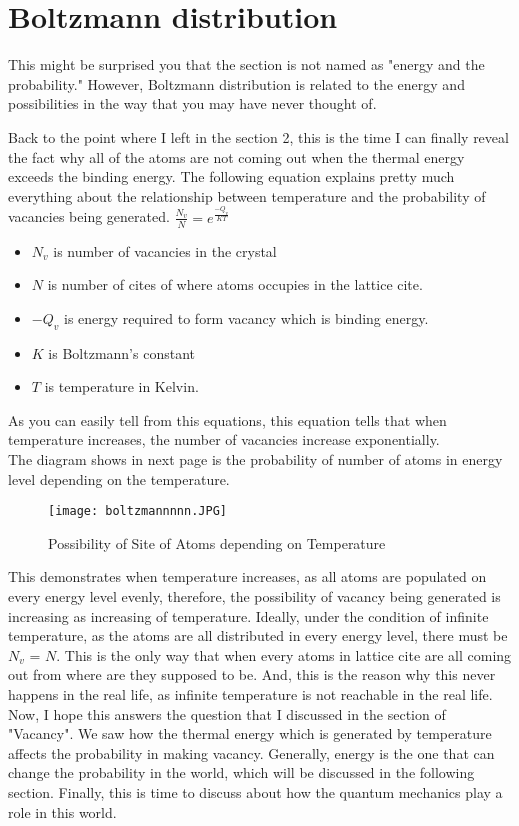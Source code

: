 \documentclass{article}
\begin{document}
\section{Boltzmann distribution}
This might be surprised you that the section is not named as "energy and the probability." However, Boltzmann distribution is related to the energy and possibilities in the way that you may have never thought of. 

Back to the point where I left in the section 2, this is the time I can finally reveal the fact why all of the atoms are not coming out when the thermal energy exceeds the binding energy. 
The following equation explains pretty much everything about the relationship between temperature and the probability of vacancies being generated. 
\LARGE
$\frac{N_v}{N} = e^\frac{-Q_v}{KT}\ $     
\\
\normalsize
\begin{itemize}
    \item $ N_v$ is number of vacancies in the crystal 
    \item $ N$ is number of cites of where atoms occupies in the lattice cite. 
    \item $-Q_v$ is energy required to form vacancy which is binding energy.
    \item $K$ is Boltzmann's constant 
    \item $T$ is temperature in Kelvin. 
\end{itemize}

As you can easily tell from this equations, this equation tells that when temperature increases, the number of vacancies increase exponentially. \\ The diagram shows in next page is the probability of number of atoms in energy level depending on the temperature.
\\

\begin{figure}
    \centering
    \texttt{[image: boltzmannnnn.JPG]}
    \caption{Possibility of Site of Atoms depending on Temperature}
    \label{fig:l}
\end{figure}
This demonstrates when temperature increases, as all atoms are populated on every energy level evenly, therefore, the possibility of vacancy being generated is increasing as increasing of temperature. Ideally, under the condition of infinite temperature, as the atoms are all distributed in every energy level, there must be $N_v$ = $N$. This is the only way that when every atoms in lattice cite are all coming out from where are they supposed to be. And, this is the reason why this never happens in the real life, as infinite temperature is not reachable in the real life. Now, I hope this answers the question that I discussed in the section of "Vacancy". We saw how the thermal energy which is generated by temperature affects the probability in making vacancy. 
Generally, energy is the one that can change the probability in the world, which will be discussed in the following section.
Finally, this is time to discuss about how the quantum mechanics play a role in this world. 
\end{document}
